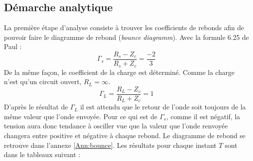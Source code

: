 \subsection{Démarche analytique}
La première étape d'analyse consiste à trouver les coefficients de rebonds afin de pouvoir faire le diagramme de rebond (\textit{bounce diagramm}).
Avec la formule 6.25 de Paul :
\begin{equation}
\Gamma_s = \frac{R_s - Z_c}{R_s + Z_c} = \frac{-2}{3}
\end{equation}
De la même façon, le coefficient de la charge est déterminé.
Comme la charge n'est qu'un circuit ouvert, $R_L = \infty$.
\begin{equation}
\Gamma_L = \frac{R_L - Z_c}{R_L + Z_c} = 1
\end{equation}
D'après le résultat de $\Gamma_L$ il est attendu que le retour de l'onde soit toujours de la même valeur que l'onde envoyée. Pour ce qui est de $\Gamma_s$, comme il est négatif, la tension aura donc tendance à osciller vue que la valeur que l'onde renvoyée changera entre positive et négative à chaque rebond.
Le diagramme de rebond se retrouve dans l'annexe \ref{Ann:bounce}. 
Les résultats pour chaque instant $T$ sont dans le tableaux suivant :






